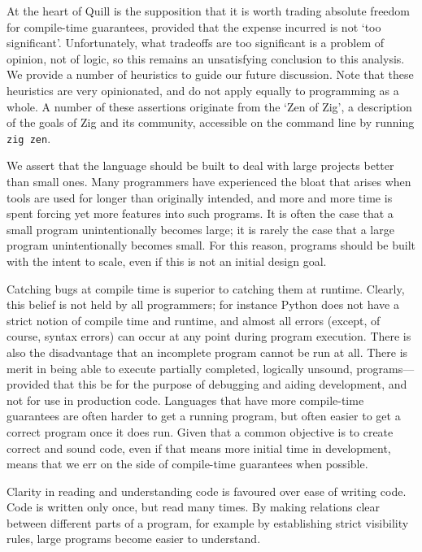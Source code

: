 \documentclass[11pt]{book}
\begin{document}
At the heart of Quill is the supposition that it is worth trading absolute freedom for compile-time guarantees, provided that the expense incurred is not `too significant'.
Unfortunately, what tradeoffs are too significant is a problem of opinion, not of logic, so this remains an unsatisfying conclusion to this analysis.
We provide a number of heuristics to guide our future discussion.
Note that these heuristics are very opinionated, and do not apply equally to programming as a whole.
A number of these assertions originate from the `Zen of Zig', a description of the goals of Zig and its community, accessible on the command line by running \lstinline{zig zen}.

We assert that the language should be built to deal with large projects better than small ones.
Many programmers have experienced the bloat that arises when tools are used for longer than originally intended, and more and more time is spent forcing yet more features into such programs.
It is often the case that a small program unintentionally becomes large; it is rarely the case that a large program unintentionally becomes small.
For this reason, programs should be built with the intent to scale, even if this is not an initial design goal.

Catching bugs at compile time is superior to catching them at runtime.
Clearly, this belief is not held by all programmers; for instance Python does not have a strict notion of compile time and runtime, and almost all errors (except, of course, syntax errors) can occur at any point during program execution.
There is also the disadvantage that an incomplete program cannot be run at all.
There is merit in being able to execute partially completed, logically unsound, programs---provided that this be for the purpose of debugging and aiding development, and not for use in production code.
Languages that have more compile-time guarantees are often harder to get a running program, but often easier to get a correct program once it does run.
Given that a common objective is to create correct and sound code, even if that means more initial time in development, means that we err on the side of compile-time guarantees when possible.

Clarity in reading and understanding code is favoured over ease of writing code.
Code is written only once, but read many times.
By making relations clear between different parts of a program, for example by establishing strict visibility rules, large programs become easier to understand.
\end{document}
